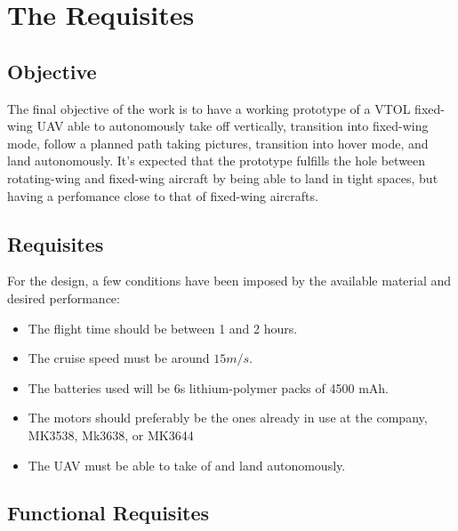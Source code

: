 \chapter{The Requisites} \label{chap:3}


\section{Objective}
%
The final objective of the work is to have a working prototype of a VTOL fixed-wing UAV able to autonomously take off vertically, transition into fixed-wing mode, follow a planned path taking pictures, transition into hover mode, and land autonomously.
%
It's expected that the prototype fulfills the hole between rotating-wing and fixed-wing aircraft by being able to land in tight spaces, but having a perfomance close to that of fixed-wing aircrafts. 

\section{Requisites}

For the design, a few conditions have been imposed by the available material and desired performance:

\begin{itemize}

\item The flight time should be between 1 and 2 hours.
\item The cruise speed must be around $15 m/s$.
\item The batteries used will be 6s lithium-polymer packs of 4500 mAh.
\item The motors should preferably be the ones already in use at the company, MK3538, Mk3638, or MK3644
\item The UAV must be able to take of and land autonomously.

\end{itemize}

\section{Functional Requisites}



